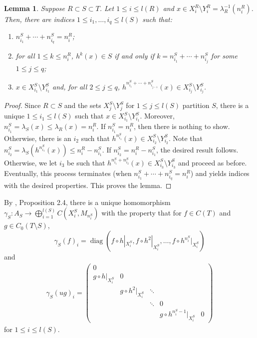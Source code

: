 \documentclass[12pt]{amsart}
\numberwithin{equation}{section}
\newtheorem{lemma}[theorem]{Lemma}
\theoremstyle{definition}
\theoremstyle{remark}
\newcommand{\diag}{\operatorname{diag}}
\begin{document}
\begin{lemma}
	\label{returning}
	Suppose $R\subset S\subset T$. Let $1\leq i\leq  l (R)$ and $x\in X_{i}^{R}\setminus Y_{i}^{R}=\lambda_{R}^{-1}(n_{i}^{R})$. Then, there are indices $1\leq i_{1},\ldots,i_{q}\leq  l (S)$ such that:
	\begin{enumerate}
		\item $n_{i_{1}}^{S}+\cdots+n_{i_{q}}^{S}=n_{i}^{R}$;
		\item for all $1\leq k\leq n_{i}^{R}$, $h^{k}(x)\in S$ if and only if $k=n_{i_{1}}^{S}+\cdots+n_{i_{j}}^{S}$ for some $1\leq j\leq q$;
		\item $x\in X_{i_{1}}^{S}\setminus Y_{i_{1}}^{S}$ and, for all $2\leq j\leq q$, $h^{n_{i_{1}}^{S}+\cdots+n_{i_{j-1}}^{S}}(x)\in X_{i_{j}}^{S}\setminus Y_{i_{j}}^{S}$.
	\end{enumerate}
\end{lemma}

\begin{proof}
	Since $R\subset S$ and the sets $X_{j}^{S}\setminus Y_{j}^{S}$ for $1\leq j\leq  l (S)$ partition $S$, there is a unique $1\leq i_{1}\leq  l (S)$ such that $x\in X_{i_{1}}^{S}\setminus Y_{i_{1}}^{S}$. Moreover, $n_{i_{1}}^{S}=\lambda_{S}(x)\leq \lambda_{R}(x)=n_{i}^{R}$. If $n_{i_{1}}^{S}=n_{i}^{R}$, then there is nothing to show. Otherwise, there is an $i_{2}$ such that $h^{n_{i_{1}}^{S}}(x)\in X_{i_{2}}^{S}\setminus Y_{i_{2}}^{S}$. Note that $n_{i_{2}}^{S}=\lambda_{S}(h^{n_{i_{1}}^{S}}(x))\leq n_{i}^{R}-n_{i_{1}}^{S}$. If $n_{i_{2}}^{S}=n_{i}^{R}-n_{i_{1}}^{S}$, the desired result follows. Otherwise, we let $i_{3}$ be such that $h^{n_{i_{1}}^{S}+n_{i_{2}}^{S}}(x)\in X_{i_{3}}^{S}\setminus Y_{i_{3}}^{S}$ and proceed as before. Eventually, this process terminates (when $n_{i_{1}}^{S}+\cdots+n_{i_{q}}^{S}=n_{i}^{R}$) and yields indices with the desired properties. This proves the lemma. 
\end{proof}

By \cite{LP2}, Proposition 2.4, there is a unique homomorphism $\gamma_{S}\colon A_{S}\to \bigoplus_{i=1}^{ l (S)}C(X_{i}^{S},M_{n_{i}^{S}})$ with the property that for $f\in C(T)$ and $g\in C_{0}(T\setminus S)$, 
\begin{equation}
	\label{function identification}
	\gamma_{S}(f)_{i}=\diag\left(f\circ h|_{X_{i}^{S}},f\circ h^{2}|_{X_{i}^{S}},\ldots,f\circ h^{n_{i}^{S}}|_{X_{i}^{S}}\right)
\end{equation}
and
\begin{equation}
	\label{ufunction identification}
	\begin{aligned}
		\gamma_{S}(ug)_{i}=
		\begin{pmatrix}
			0 & & & & \\
			g\circ h|_{X_{i}^{S}} & 0 & & & \\
			& g\circ h^{2}|_{X_{i}^{S}} & \ddots & &\\
			& & \ddots & 0 &\\
			& & & g\circ h^{n_{i}^{S}-1}|_{X_{i}^{S}} & 0
		\end{pmatrix}	
	\end{aligned}
\end{equation}
for $1\leq i\leq  l (S)$. 
\end{document}
